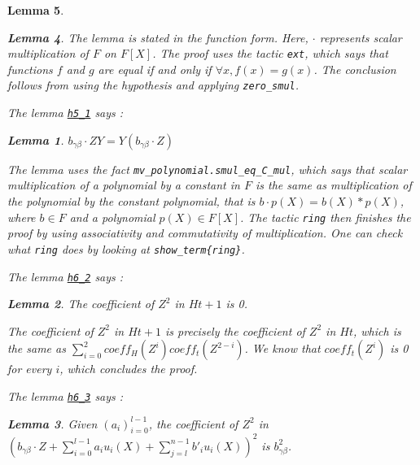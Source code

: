 \documentclass{article}
\newtheorem{lemma}{Lemma}
\theoremstyle{definition}
\theoremstyle{remark}
\begin{document}
\begin{lemma}
\begin{lemma}
The lemma is stated in the function form. Here, $\cdot$ represents scalar multiplication of $F$ on $F[X]$.
The proof uses the tactic \texttt{ext}, which says that functions $f$ and $g$ are equal if and only if $\forall x, f(x) = g(x)$. The conclusion follows from 
using the hypothesis and applying \texttt{zero\_smul}.

The lemma \href{https://github.com/BoltonBailey/formal-snarks-project/blob/7fd9cd122f5887f88f6a706b4f2a68a7153c7381/src/snarks/babysnark/knowledge_soundness.lean#L272}{\texttt{h5\_1}} says :
\theoremstyle{lemma} \label{h5_1}
\begin{lemma}
    $b_{\gamma \beta} \cdot ZY = Y (b_{\gamma \beta} \cdot Z)$
\end{lemma}

The lemma uses the fact \texttt{mv\_polynomial.smul\_eq\_C\_mul}, which says that scalar multiplication of a polynomial by a constant in $F$ is the same as multiplication of 
the polynomial by the constant polynomial, that is $b \cdot p(X) = b(X) * p(X)$, where $b \in F$ and a polynomial $p(X) \in F[X]$. The tactic \texttt{ring} then finishes the proof 
by using associativity and commutativity of multiplication. One can check what \texttt{ring} does by looking at \texttt{show\_term\{ring\}}.

The lemma \href{https://github.com/BoltonBailey/formal-snarks-project/blob/7fd9cd122f5887f88f6a706b4f2a68a7153c7381/src/snarks/babysnark/knowledge_soundness.lean#L279}{\texttt{h6\_2}} says : 
\theoremstyle{lemma}
\begin{lemma} \label{h6_2}
  The coefficient of $Z^2$ in $H t + 1$ is 0.
\end{lemma}

The coefficient of $Z^2$ in $H t + 1$ is precisely the coefficient of $Z^2$ in $H t$, which is the same as $\sum_{i= 0}^2 coeff_{H}(Z^i) coeff_{t}(Z^{2 - i})$.
We know that $coeff_{t}(Z^i)$ is 0 for every $i$, which concludes the proof.

The lemma \href{https://github.com/BoltonBailey/formal-snarks-project/blob/7fd9cd122f5887f88f6a706b4f2a68a7153c7381/src/snarks/babysnark/knowledge_soundness.lean#L311}{\texttt{h6\_3}} says : 
\theoremstyle{lemma}
\begin{lemma} \label{h6_3}
  Given $(a_i)_{i = 0}^{l - 1}$, the coefficient of $Z^2$ in $(b_{\gamma \beta} \cdot Z + \sum_{i = 0}^{l - 1} a_i u_i (X) + \sum_{j = l}^{n - 1} b'_i u_i (X))^2$ is $b_{\gamma \beta}^2$.
\end{lemma}


\end{lemma}
\end{lemma}
\end{document}
